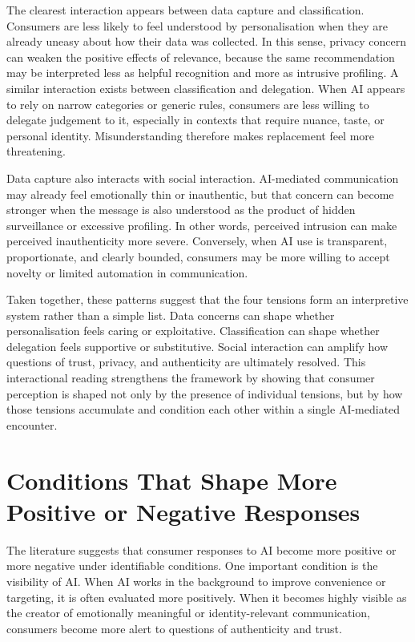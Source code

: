 The clearest interaction appears between data capture and classification. Consumers are less likely to feel understood by personalisation when they are already uneasy about how their data was collected. In this sense, privacy concern can weaken the positive effects of relevance, because the same recommendation may be interpreted less as helpful recognition and more as intrusive profiling. A similar interaction exists between classification and delegation. When AI appears to rely on narrow categories or generic rules, consumers are less willing to delegate judgement to it, especially in contexts that require nuance, taste, or personal identity. Misunderstanding therefore makes replacement feel more threatening.

Data capture also interacts with social interaction. AI-mediated communication may already feel emotionally thin or inauthentic, but that concern can become stronger when the message is also understood as the product of hidden surveillance or excessive profiling. In other words, perceived intrusion can make perceived inauthenticity more severe. Conversely, when AI use is transparent, proportionate, and clearly bounded, consumers may be more willing to accept novelty or limited automation in communication.

Taken together, these patterns suggest that the four tensions form an interpretive system rather than a simple list. Data concerns can shape whether personalisation feels caring or exploitative. Classification can shape whether delegation feels supportive or substitutive. Social interaction can amplify how questions of trust, privacy, and authenticity are ultimately resolved. This interactional reading strengthens the framework by showing that consumer perception is shaped not only by the presence of individual tensions, but by how those tensions accumulate and condition each other within a single AI-mediated encounter.

\section{Conditions That Shape More Positive or Negative Responses}
The literature suggests that consumer responses to AI become more positive or more negative under identifiable conditions. One important condition is the visibility of AI. When AI works in the background to improve convenience or targeting, it is often evaluated more positively. When it becomes highly visible as the creator of emotionally meaningful or identity-relevant communication, consumers become more alert to questions of authenticity and trust.

